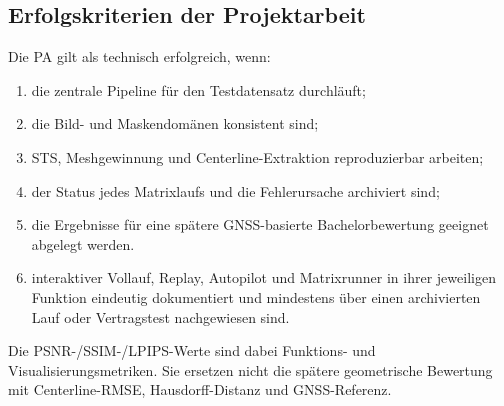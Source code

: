 \subsection{Erfolgskriterien der Projektarbeit}

Die PA gilt als technisch erfolgreich, wenn:

\begin{enumerate}
  \item die zentrale Pipeline für den Testdatensatz durchläuft;
  \item die Bild- und Maskendomänen konsistent sind;
  \item STS, Meshgewinnung und Centerline-Extraktion reproduzierbar arbeiten;
  \item der Status jedes Matrixlaufs und die Fehlerursache archiviert sind;
  \item die Ergebnisse für eine spätere GNSS-basierte Bachelorbewertung
        geeignet abgelegt werden.
    \item interaktiver Vollauf, Replay, Autopilot und Matrixrunner in ihrer
      jeweiligen Funktion eindeutig dokumentiert und mindestens über einen
      archivierten Lauf oder Vertragstest nachgewiesen sind.
\end{enumerate}

Die PSNR-/SSIM-/LPIPS-Werte sind dabei Funktions- und Visualisierungsmetriken.
Sie ersetzen nicht die spätere geometrische Bewertung mit Centerline-RMSE,
Hausdorff-Distanz und GNSS-Referenz.
